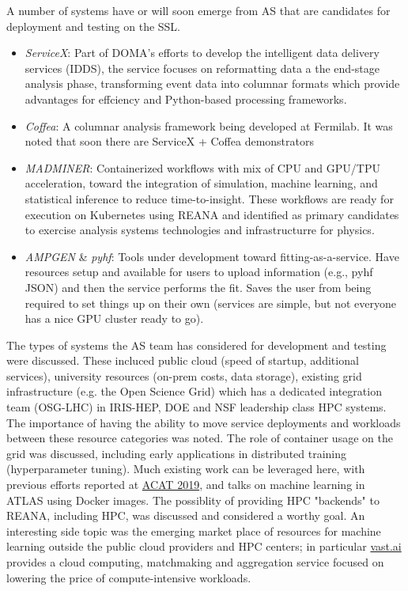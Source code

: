 \documentclass[11pt,letterpaper,fleqn]{article}
\begin{document}
A number of systems have or will soon emerge from AS that are candidates for deployment and testing on the SSL.

\begin{itemize}
  \item {\it ServiceX}: Part of DOMA's efforts to develop the intelligent data delivery services (IDDS), the service focuses on reformatting data a the end-stage analysis phase, transforming event data into columnar formats which provide advantages for effciency and Python-based processing frameworks.
  \item {\it Coffea}: A columnar analysis framework being developed at Fermilab. It was noted that soon there are ServiceX + Coffea demonstrators
  \item {\it MADMINER}: Containerized workflows with mix of CPU and GPU/TPU acceleration, toward the integration of simulation, machine learning, and statistical inference to reduce time-to-insight. These workflows are ready for execution on Kubernetes using REANA and identified as primary candidates to exercise analysis systems technologies and infrastructurre for physics.
  \item {\it AMPGEN} \& {\it pyhf}: Tools under development toward fitting-as-a-service. Have resources setup and available for users to upload information (e.g., pyhf JSON) and then the service performs the fit. Saves the user from being required to set things up on their own (services are simple, but not everyone has a nice GPU cluster ready to go).
\end{itemize}

The types of systems the AS team has considered for development and testing were discussed.  These incluced public cloud (speed of startup, additional services), university resources (on-prem costs, data storage), existing grid infrastructure (e.g. the Open Science Grid) which has a dedicated integration team (OSG-LHC) in IRIS-HEP, DOE and NSF leadership class HPC systems.  The importance of having the ability to move service deployments and workloads between these resource categories was noted.
The role of container usage on the grid was discussed, including early applications in distributed training (hyperparameter tuning).  Much existing work can be leveraged here, with previous efforts reported at \href{https://indico.cern.ch/event/708041/}{ACAT 2019}, and talks on machine learning in ATLAS using Docker images.
The possiblity of providing HPC "backends" to REANA, including HPC, was discussed and considered a worthy goal.  An interesting side topic was the emerging market place of resources for machine learning outside the public cloud providers and HPC centers; in particular \href{Vast.ai}{vast.ai} provides a cloud computing,   matchmaking and aggregation service focused on lowering the price of compute-intensive workloads.
\end{document}
